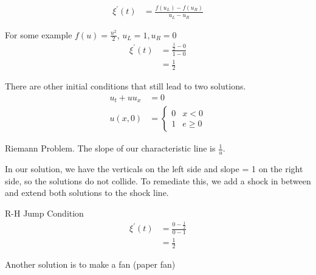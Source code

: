 \documentclass{article}
\begin{document}
%
%


%
\begin{align}
  \xi^\prime(t) & = \frac{f(u_L) - f(u_R)}{u_L - u_R}
\end{align}

For some example $f(u) = \frac{u^2}{2}$, $u_L = 1, u_R = 0$
%
\begin{align}
  \xi^\prime(t) & = \frac{\frac{1}{2} - 0}{1 - 0}\\
  & = \frac{1}{2}
\end{align}

There are other initial conditions that still lead to two solutions.
%
\begin{align}
  u_t + uu_x & = 0\\
  u(x, 0) & =
  \begin{cases}
    0 & x < 0\\
    1 & e \geq 0
  \end{cases}
\end{align}

Riemann Problem. The slope of our characteristic line is $\frac{1}{u}$.

In our solution, we have the verticals on the left side and slope = 1 on the right side, so the solutions do not collide. To remediate this, we add a shock in between and extend both solutions to the shock line.

R-H Jump Condition
%
\begin{align}
  \xi^\prime(t) & = \frac{0 - \frac{1}{2}}{0 - 1}\\
  & = \frac{1}{2}
\end{align}

Another solution is to make a fan (paper fan)
\end{document}
